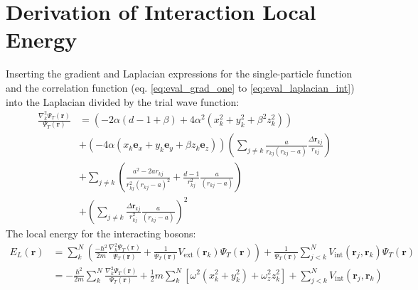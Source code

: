 \documentclass[12pt,a4paper,english]{article}
\begin{document}
\section{Derivation of Interaction Local Energy}
\label{appendix:local_E}
Inserting the gradient and Laplacian expressions for the single-particle function and the correlation function (eq. \ref{eq:eval_grad_one} to \ref{eq:eval_laplacian_int}) into the Laplacian divided by the trial wave function:
\begin{align}
\label{eq:H_int_deriv}
\frac{\nabla_k^2\Psi_T(\textbf{r})}{\Psi_T(\textbf{r})}&= \left(-2\alpha(d-1+\beta)+4\alpha^2(x_k^2+y_k^2+\beta^2z_k^2)\right)\nonumber\\
&+\left(-4\alpha(x_k\textbf{e}_x+y_k\textbf{e}_y+\beta z_k\textbf{e}_z)\right)\left(\sum_{j\neq k}\frac{a}{r_{kj}(r_{kj}-a)}\frac{\Delta\textbf{r}_{kj}}{r_{kj}}\right)\nonumber\\
&+\sum_{j\neq k}\left(\frac{a^2-2ar_{kj}}{r_{kj}^2(r_{kj}-a)^2}+\frac{d-1}{r_{kj}^2}\frac{a}{(r_{kj}-a)}\right)\nonumber\\
&+\left(\sum_{j\neq k}\frac{\Delta \textbf{r}_{kj}}{r_{kj}^2}\frac{a}{(r_{kj}-a)}\right)^2
\end{align}
The local energy for the interacting bosons:
\begin{align}
\label{eq:local_E_deriv}
E_L(\textbf{r})&=\sum_k^N\left(\frac{-\hbar^2}{2m}\frac{\nabla_k^2\Psi_T(\textbf{r})}{\Psi_T(\textbf{r})}+\frac{1}{\Psi_T(\mathbf{r})}V_{\text{ext}}(\textbf{r}_k)\Psi_T(\mathbf{r})\right)+\frac{1}{\Psi_T(\mathbf{r})}\sum_{j<k}^{N}V_{\text{int}}(\textbf{r}_j,\textbf{r}_k)\Psi_T(\mathbf{r})\nonumber\\
&=-\frac{\hbar^2}{2m}\sum_k^N\frac{\nabla_k^2\Psi_T(\textbf{r})}{\Psi_T(\textbf{r})}
+\frac{1}{2}m\sum_k^N[\omega^2(x_k^2+y_k^2) + \omega_z^2z_k^2]
+\sum_{j<k}^{N}V_{\text{int}}(\textbf{r}_j,\textbf{r}_k)
\end{align}



\end{document}
